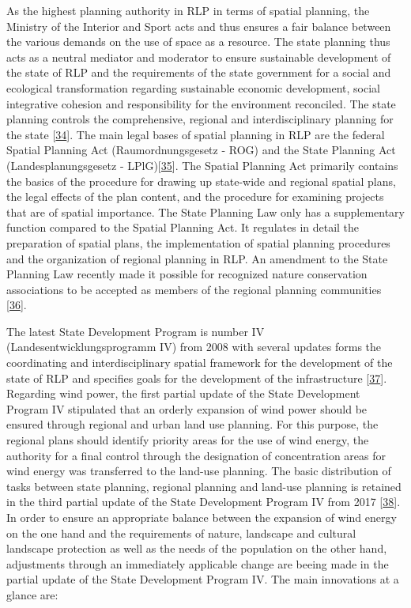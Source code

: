 \documentclass[a4paper,11pt]{article}
\begin{document}
As the highest planning authority in RLP in terms of spatial planning, the Ministry of the Interior and Sport acts and thus ensures a fair balance between the various demands on the use of space as a resource. The state planning thus acts as a neutral mediator and moderator to ensure sustainable development of the state of RLP and the requirements of the state government for a social and ecological transformation regarding sustainable economic development, social integrative cohesion and responsibility for the environment reconciled. The state planning controls the comprehensive, regional and interdisciplinary planning for the state {[}\protect\hyperlink{ref-MinisteriumdesInnernundfurSport.2021}{34}{]}. The main legal bases of spatial planning in RLP are the federal Spatial Planning Act (Raumordnungsgesetz - ROG) and the State Planning Act (Landesplanungsgesetz - LPlG){[}\protect\hyperlink{ref-BundesministeriumderJustizundfurVerbraucherschutz.2008}{35}{]}. The Spatial Planning Act primarily contains the basics of the procedure for drawing up state-wide and regional spatial plans, the legal effects of the plan content, and the procedure for examining projects that are of spatial importance. The State Planning Law only has a supplementary function compared to the Spatial Planning Act. It regulates in detail the preparation of spatial plans, the implementation of spatial planning procedures and the organization of regional planning in RLP. An amendment to the State Planning Law recently made it possible for recognized nature conservation associations to be accepted as members of the regional planning communities {[}\protect\hyperlink{ref-MinisteriumderJustizRheinlandPfalz.2003}{36}{]}.

The latest State Development Program is number IV (Landesentwicklungsprogramm IV) from 2008 with several updates forms the coordinating and interdisciplinary spatial framework for the development of the state of RLP and specifies goals for the development of the infrastructure {[}\protect\hyperlink{ref-MinisteriumdesInnernundfurSport.2008}{37}{]}. Regarding wind power, the first partial update of the State Development Program IV stipulated that an orderly expansion of wind power should be ensured through regional and urban land use planning. For this purpose, the regional plans should identify priority areas for the use of wind energy, the authority for a final control through the designation of concentration areas for wind energy was transferred to the land-use planning. The basic distribution of tasks between state planning, regional planning and land-use planning is retained in the third partial update of the State Development Program IV from 2017 {[}\protect\hyperlink{ref-MinisteriumdesInnernundfurSport.2017}{38}{]}. In order to ensure an appropriate balance between the expansion of wind energy on the one hand and the requirements of nature, landscape and cultural landscape protection as well as the needs of the population on the other hand, adjustments through an immediately applicable change are beeing made in the partial update of the State Development Program IV. The main innovations at a glance are:
\end{document}
